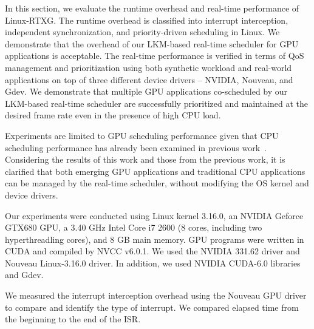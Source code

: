 \label{sec:evaluation}
In this section, we evaluate the runtime overhead and real-time
performance of Linux-RTXG.
The runtime overhead is classified into interrupt interception,
independent synchronization, and priority-driven scheduling in Linux.
We demonstrate that the overhead of our LKM-based real-time scheduler
for GPU applications is acceptable.
The real-time performance is verified in terms of QoS management and
prioritization using both synthetic workload and real-world
applications on top of three different device drivers -- NVIDIA,
Nouveau, and Gdev.
We demonstrate that multiple GPU applications co-scheduled by our
LKM-based real-time scheduler are successfully prioritized and
maintained at the desired frame rate even in the presence of high CPU
load.

Experiments are limited to GPU scheduling performance given that CPU
scheduling performance has already been examined in previous
work~\cite{kato2009loadable}.
Considering the results of this work and those from the previous work,
it is clarified that both emerging GPU applications and traditional CPU
applications can be managed by the real-time scheduler, without
modifying the OS kernel and device drivers.

Our experiments were conducted using Linux kernel 3.16.0, an NVIDIA Geforce GTX680 GPU, a 3.40 GHz Intel Core i7 2600 (8 cores, including two hyperthreadling cores), and 8 GB main memory.
GPU programs were written in CUDA and compiled by NVCC v6.0.1.
We used the NVIDIA 331.62 driver and Nouveau Linux-3.16.0 driver.
In addition, we used NVIDIA CUDA-6.0 libraries and Gdev.

We measured the interrupt interception overhead using the Nouveau GPU driver to compare and identify the type of interrupt.
We compared elapsed time from the beginning to the end of the ISR.

